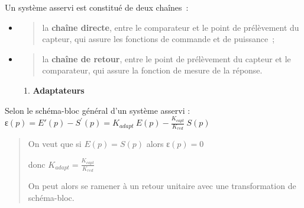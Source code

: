 Un système asservi est constitué de deux chaînes~:

\begin{itemize}
\item
  \begin{quote}
  la \textbf{chaîne directe}, entre le comparateur et le point de prélèvement du capteur, qui assure les fonctions de commande et de puissance~;
  \end{quote}
\item
  \begin{quote}
  la \textbf{chaîne de retour}, entre le point de prélèvement du capteur et le comparateur, qui assure la fonction de mesure de la réponse.
  \end{quote}

  \begin{enumerate}
  \def\labelenumi{\arabic{enumi}.}
  \item
    \protect\hypertarget{_Toc149497259}{}{}\textbf{Adaptateurs}
  \end{enumerate}
\end{itemize}

Selon le schéma-bloc général d'un système asservi : \(ɛ(p) = E'(p) - S^{'}(p) = K_{adapt}\ E(p) - \frac{K_{capt}}{K_{red}}\ S(p)\)

\begin{quote}
On veut que si \(E(p) = S(p)\) alors \(ɛ(p) = 0\)

donc \(K_{adapt} = \frac{K_{capt}}{K_{red}}\)

On peut alors se ramener à un retour unitaire avec une transformation de schéma-bloc.
\end{quote}

